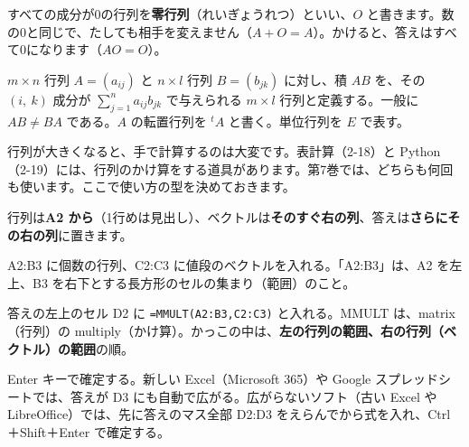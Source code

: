 すべての成分が0の行列を\textbf{零行列}（れいぎょうれつ）といい、$O$ と書きます。数の0と同じで、たしても相手を変えません（$A+O=A$）。かけると、答えはすべて0になります（$AO=O$）。

\begin{senmonsho}[大学の教科書ふうの書き方]
\begin{bkhonbun}
$m\times n$ 行列 $A=(a_{ij})$ と $n\times l$ 行列 $B=(b_{jk})$ に対し、積 $AB$ を、その $(i,\ k)$ 成分が $\sum_{j=1}^{n}a_{ij}b_{jk}$ で与えられる $m\times l$ 行列と定義する。一般に $AB\neq BA$ である。$A$ の転置行列を ${}^tA$ と書く。単位行列を $E$ で表す。
\end{bkhonbun}
\end{senmonsho}


\label{bk:7-1:keisan}行列が大きくなると、手で計算するのは大変です。表計算（2-18）と Python（2-19）には、行列のかけ算をする道具があります。第7巻では、どちらも何回も使います。ここで使い方の型を決めておきます。

行列は\textbf{A2 から}（1行めは見出し）、ベクトルは\textbf{そのすぐ右の列}、答えは\textbf{さらにその右の列}に置きます。

\begin{bkcenter}
\par\vspace{1mm}
\label{bk:7-1:tab-mmult}
\end{bkcenter}

\begin{enumerate}[label={\bkcircled[\bkTF]{\arabic*}}, leftmargin=2.4\zw, itemsep=1pt, topsep=2pt]
\item A2:B3 に個数の行列、C2:C3 に値段のベクトルを入れる。「A2:B3」は、A2 を左上、B3 を右下とする長方形のセルの集まり（範囲）のこと。
\item 答えの左上のセル D2 に \texttt{=MMULT(A2:B3,C2:C3)} と入れる。MMULT は、matrix（行列）の multiply（かけ算）。かっこの中は、\textbf{左の行列の範囲、右の行列（ベクトル）の範囲}の順。
\item Enter キーで確定する。新しい Excel（Microsoft 365）や Google スプレッドシートでは、答えが D3 にも自動で広がる。広がらないソフト（古い Excel や LibreOffice）では、先に答えのマス全部 D2:D3 をえらんでから式を入れ、Ctrl＋Shift＋Enter で確定する。
\end{enumerate}


